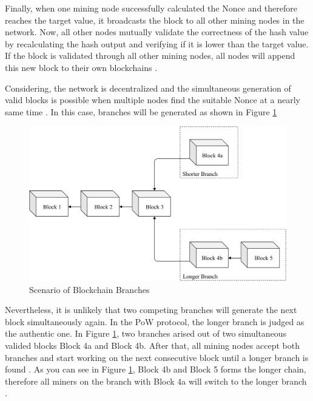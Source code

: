 Finally, when one mining node successfully calculated the Nonce and therefore reaches the target value, 
it broadcasts the block to all other mining nodes in the network. Now, all other nodes mutually validate the correctness of the hash value
by recalculating the hash output and verifying if it is lower than the target value. 
If the block is validated through all other mining nodes, all nodes will append this new block to their own blockchains .  

Considering, the network is decentralized and the simultaneous generation of valid blocks is possible when multiple nodes find 
the suitable Nonce at a nearly same time . In this case, branches will be generated as shown in Figure \ref{figure:blockchain_branches}

\begin{figure}[htbp]
	\centering
	\includegraphics[width=.9\linewidth]{./figures/blockchain_branches.pdf}
	\caption{Scenario of Blockchain Branches}
	\label{figure:blockchain_branches}
\end{figure}

Nevertheless, it is unlikely that two competing branches will generate the next block simultaneously again. 
In the PoW protocol, the longer branch is judged as the authentic one. 
In Figure \ref{figure:blockchain_branches}, two branches arised out of 
two simultaneous valided blocks Block 4a and Block 4b. 
After that, all mining nodes accept both branches and start working on 
the next consecutive block until a longer branch is found . 
As you can see in Figure \ref{figure:blockchain_branches}, Block 4b and Block 5 forms the longer 
chain, therefore all miners on the branch with Block 4a will switch to 
the longer branch . 


